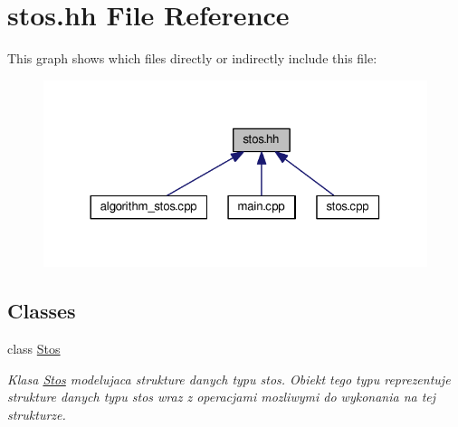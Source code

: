 \hypertarget{stos_8hh}{\section{stos.\-hh File Reference}
\label{stos_8hh}
}
This graph shows which files directly or indirectly include this file\-:\nopagebreak
\begin{figure}[H]
\begin{center}
\leavevmode
\includegraphics[width=323pt]{stos_8hh__dep__incl}
\end{center}
\end{figure}
\subsection*{Classes}
\begin{DoxyCompactItemize}
\item 
class \hyperlink{class_stos}{Stos}
\begin{DoxyCompactList}\small\item\em Klasa \hyperlink{class_stos}{Stos} modelujaca strukture danych typu stos. Obiekt tego typu reprezentuje strukture danych typu stos wraz z operacjami mozliwymi do wykonania na tej strukturze. \end{DoxyCompactList}\end{DoxyCompactItemize}
